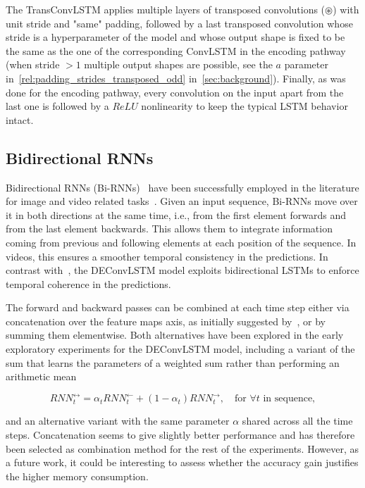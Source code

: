 \noindent The TransConvLSTM applies multiple layers of transposed convolutions
($\circledast$) with unit stride and "same" padding, followed by a last
transposed convolution whose stride is a hyperparameter of the model and whose
output shape is fixed to be the same as the one of the corresponding ConvLSTM
in the encoding pathway (when stride $> 1$ multiple output shapes are possible,
see the $a$ parameter in~\autoref{rel:padding_strides_transposed_odd}
in~\autoref{sec:background}). Finally, as was done for the encoding pathway,
every convolution on the input apart from the last one is followed by a $ReLU$
nonlinearity to keep the typical LSTM behavior intact.

\subsection{Bidirectional RNNs}\label{deconvLSTM_biRNN}
Bidirectional RNNs (Bi-RNNs)~\citep{Schuster1997bidirecrnn} have been
successfully employed in the literature for image and video related
tasks~\citep{Graves+Schmidhuber-2009,visin2015renet,Du2015_CVPR,
Visin_2016_CVPR_Workshops}. Given an input sequence, Bi-RNNs move over it in
both directions at the same time, i.e., from the first element forwards and
from the last element backwards. This allows them to integrate information
coming from previous and following elements at each position of the sequence.
In videos, this ensures a smoother temporal consistency in the predictions. In
contrast with~\citep{ShiCWYWW15}, the DEConvLSTM model exploits bidirectional
LSTMs to enforce temporal coherence in the predictions.

The forward and backward passes can be combined at each time step either via
concatenation over the feature maps axis, as initially suggested by~\citep{
Schuster1997bidirecrnn}, or by summing them elementwise. Both alternatives have
been explored in the early exploratory experiments for the DEConvLSTM model,
including a variant of the sum that learns the parameters of a weighted sum
rather than performing an arithmetic mean

\begin{equation}
    RNN_t^{\leftrightarrow} = \alpha_t RNN_t^{\leftarrow} +
        (1 - \alpha_t) RNN_t^{\rightarrow}, \quad\text{for $\forall t$ in
        sequence},
\end{equation}

\noindent and an alternative variant with the same parameter $\alpha$ shared
across all the time steps. Concatenation seems to give slightly better
performance and has therefore been selected as combination method for the
rest of the experiments. However, as a future work, it could be interesting to
assess whether the accuracy gain justifies the higher memory consumption.


